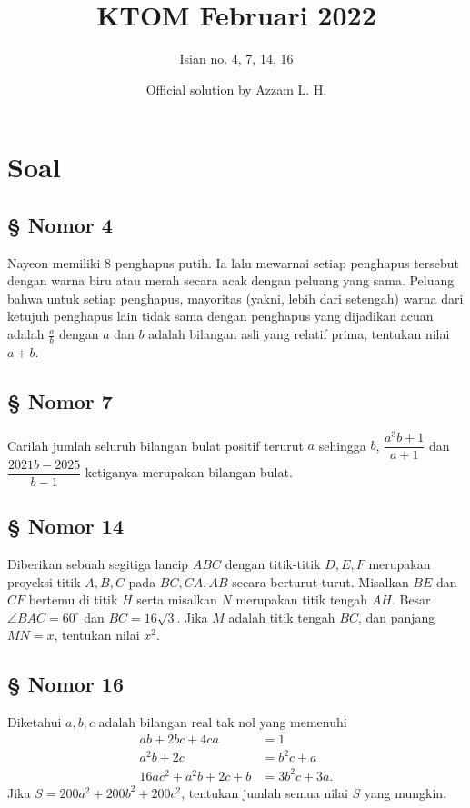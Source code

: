\documentclass[12pt]{scrartcl}
\title{\textcolor{Red!80}{K}\textcolor{Green!80}{T}\textcolor{Blue!70}{O}\textcolor{YellowOrange!80}{M} Februari 2022}
\author{Isian no. 4, 7, 14, 16}
\date{Official solution by Azzam L. H.}
\begin{document}
\maketitle
\pagestyle{plain}


\section{Soal}
\subsection*{\protect\textcolor{EvanRed}{\S} Nomor 4} Nayeon memiliki 8 penghapus putih. Ia lalu mewarnai setiap penghapus tersebut dengan warna biru atau merah secara acak dengan peluang yang sama. Peluang bahwa untuk setiap penghapus, mayoritas (yakni, lebih dari setengah) warna dari ketujuh penghapus lain tidak sama dengan penghapus yang dijadikan acuan adalah $\frac{a}{b}$ dengan $a$ dan $b$ adalah bilangan asli yang relatif prima, tentukan nilai $a+b$.

\subsection*{\protect\textcolor{EvanRed}{\S} Nomor 7} Carilah jumlah seluruh bilangan bulat positif terurut $a$ sehingga $b$, $\dfrac{a^3b+1}{a+1}$ dan $\dfrac{2021b-2025}{b-1}$ ketiganya merupakan bilangan bulat.

\subsection*{\protect\textcolor{EvanRed}{\S} Nomor 14} Diberikan sebuah segitiga lancip $ABC$ dengan titik-titik $D,E,F$ merupakan proyeksi titik $A,B,C$ pada $BC,CA,AB$ secara berturut-turut. Misalkan $BE$ dan $CF$ bertemu di titik $H$ serta misalkan $N$ merupakan titik tengah $AH$. Besar$\angle BAC = 60^\circ$ dan $BC=16\sqrt{3}$. Jika $M$ adalah titik tengah $BC$, dan panjang $MN = x$, tentukan nilai $x^2$.


\subsection*{\protect\textcolor{EvanRed}{\S} Nomor 16} Diketahui $a,b,c$ adalah bilangan real tak nol yang memenuhi 
\begin{align*}
    ab+2bc+4ca&=1\\
    a^2b+2c&=b^2c+a\\
    16ac^2+a^2b+2c+b &= 3b^2c+3a.
\end{align*}
Jika $S=200a^2+200b^2+200c^2$, tentukan jumlah semua nilai $S$ yang mungkin.
\end{document}
